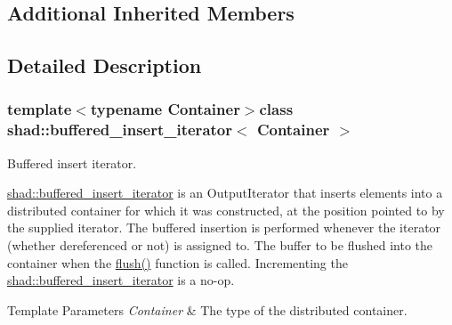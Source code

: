 \subsection*{Additional Inherited Members}


\subsection{Detailed Description}
\subsubsection*{template$<$typename Container$>$class shad\-::buffered\-\_\-insert\-\_\-iterator$<$ Container $>$}

Buffered insert iterator. 

\hyperlink{classshad_1_1buffered__insert__iterator}{shad\-::buffered\-\_\-insert\-\_\-iterator} is an Output\-Iterator that inserts elements into a distributed container for which it was constructed, at the position pointed to by the supplied iterator. The buffered insertion is performed whenever the iterator (whether dereferenced or not) is assigned to. The buffer to be flushed into the container when the \hyperlink{classshad_1_1buffered__insert__iterator_aadf229f6aac3dbdfc204b7f6309b2e71}{flush()} function is called. Incrementing the \hyperlink{classshad_1_1buffered__insert__iterator}{shad\-::buffered\-\_\-insert\-\_\-iterator} is a no-\/op.


\begin{DoxyTemplParams}{Template Parameters}
{\em Container} & The type of the distributed container. \\
\hline
\end{DoxyTemplParams}



